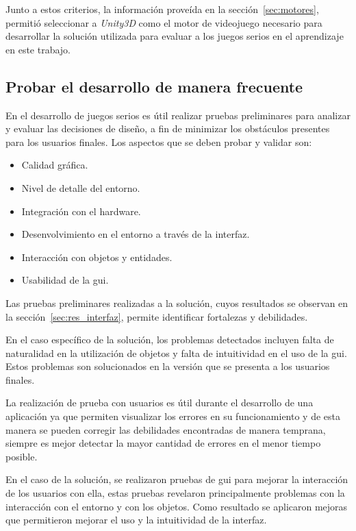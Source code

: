 Junto a estos criterios, la información proveída en la
sección~\ref{sec:motores}, permitió seleccionar a \textit{Unity3D} como el motor
de videojuego necesario para desarrollar la solución utilizada para evaluar a
los juegos serios en el aprendizaje en este trabajo.

\subsection{Probar el desarrollo de manera frecuente}

En el desarrollo de juegos serios es útil realizar pruebas preliminares para
analizar y evaluar las decisiones de diseño, a fin de minimizar los obstáculos
presentes para los usuarios finales. Los aspectos que se deben probar y validar
son:

\begin{itemize}
    \item Calidad gráfica.
    \item Nivel de detalle del entorno.
    \item Integración con el hardware.
    \item Desenvolvimiento en el entorno a través de la interfaz.
    \item Interacción con objetos y entidades.
    \item Usabilidad de la \gls{gui}.
\end{itemize}

Las pruebas preliminares realizadas a la solución, cuyos resultados se observan
en la sección~\ref{sec:res_interfaz}, permite identificar fortalezas y
debilidades. 

En el caso específico de la solución, los problemas detectados incluyen falta de
naturalidad en la utilización de objetos y falta de intuitividad en el uso de la
\Gls{gui}. Estos problemas son solucionados en la versión que se presenta a los
usuarios finales.

La realización de prueba con usuarios es útil durante el desarrollo de una
aplicación ya que permiten visualizar los errores en su funcionamiento y de esta
manera se pueden corregir las debilidades encontradas de manera temprana,
siempre es mejor detectar la mayor cantidad de errores en el menor tiempo
posible.

En el caso de la solución, se realizaron pruebas de \Gls{gui} para mejorar la
interacción de los usuarios con ella, estas pruebas revelaron principalmente
problemas con la interacción con el entorno y con los objetos. Como resultado se
aplicaron mejoras que permitieron mejorar el uso y la intuitividad de la
interfaz.

